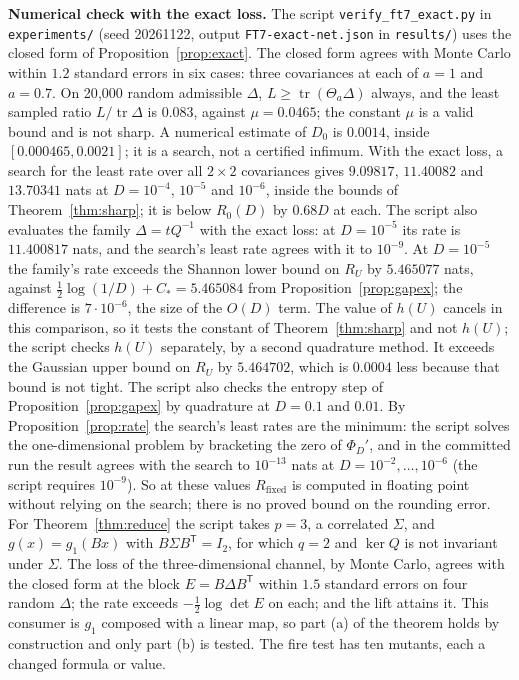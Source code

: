 \documentclass[11pt,onecolumn]{IEEEtran}
\newcommand{\tr}{\operatorname{tr}}
\newcommand{\Rfix}{R_{\mathrm{fixed}}}
\begin{document}
\begin{sloppypar}
\textbf{Numerical check with the exact loss.} The script
\texttt{verify\_ft7\_exact.py} in \texttt{experiments/} (seed 20261122, output
\texttt{FT7-exact-net.json} in \texttt{results/}) uses the closed form of
Proposition~\ref{prop:exact}. The closed form agrees with Monte Carlo within $1.2$
standard errors in six cases: three covariances at each of $a=1$ and $a=0.7$. On 20{,}000 random admissible
$\Delta$, $L\ge\tr(\Theta_a\Delta)$ always, and the least sampled ratio $L/\tr\Delta$ is $0.083$,
against $\mu=0.0465$; the constant $\mu$ is a valid bound and is not sharp. A numerical
estimate of $D_0$ is $0.0014$, inside $[0.000465,0.0021]$; it is a search, not a certified
infimum. With the exact loss, a search for the least rate over all $2\times2$ covariances
gives $9.09817$, $11.40082$ and $13.70341$ nats at $D=10^{-4}$, $10^{-5}$ and $10^{-6}$,
inside the bounds of Theorem~\ref{thm:sharp}; it is below $R_0(D)$ by $0.68D$ at each. The
script also evaluates the family $\Delta=tQ^{-1}$ with the exact loss: at $D=10^{-5}$ its
rate is $11.400817$ nats, and the search's least rate agrees with it to $10^{-9}$. At $D=10^{-5}$ the family's rate exceeds the Shannon lower bound on $R_U$ by $5.465077$
nats, against $\tfrac12\log(1/D)+C_*=5.465084$ from Proposition~\ref{prop:gapex}; the
difference is $7\cdot10^{-6}$, the size of the $O(D)$ term. The value of $h(U)$ cancels in
this comparison, so it tests the constant of Theorem~\ref{thm:sharp} and not $h(U)$; the
script checks $h(U)$ separately, by a second quadrature method. It exceeds the Gaussian upper
bound on $R_U$ by $5.464702$, which is $0.0004$ less because that bound is not tight. The script also checks the entropy step of Proposition~\ref{prop:gapex} by quadrature at
$D=0.1$ and $0.01$. By Proposition~\ref{prop:rate} the search's least rates are the
minimum: the script solves the one-dimensional problem by bracketing the zero of
$\Phi_D'$, and in the committed run the result agrees with the search to $10^{-13}$ nats at
$D=10^{-2},\dots,10^{-6}$ (the script requires $10^{-9}$). So at these values $\Rfix$ is
computed in floating point without relying on the search; there is no proved bound on
the rounding error. For
Theorem~\ref{thm:reduce} the script takes $p=3$, a correlated $\Sigma$, and
$g(x)=g_1(Bx)$ with $B\Sigma B^{\mathsf T}=I_2$, for which $q=2$ and $\ker Q$ is not
invariant under $\Sigma$. The loss of the three-dimensional channel, by Monte Carlo,
agrees with the closed form at the block $E=B\Delta B^{\mathsf T}$ within $1.5$ standard
errors on four random $\Delta$; the rate exceeds $-\tfrac12\log\det E$ on each; and the
lift attains it. This consumer is $g_1$ composed with a linear map, so part (a) of the
theorem holds by construction and only part (b) is tested. The fire test has ten mutants,
each a changed formula or value.
\end{sloppypar}
\end{document}
